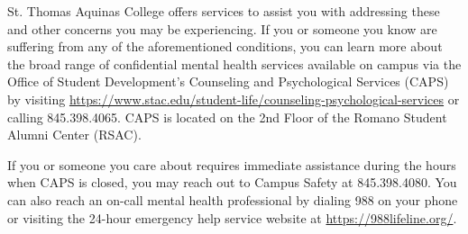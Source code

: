 \documentclass[11pt,letterpaper]{article}
\begin{document}
St. Thomas Aquinas College offers services to assist you with addressing these and other concerns you may be experiencing. If you or someone you know are suffering from any of the aforementioned conditions, you can learn more about the broad range of confidential mental health services available on campus via the Office of Student Development’s Counseling and Psychological Services (CAPS) by visiting \url{https://www.stac.edu/student-life/counseling-psychological-services} or calling 845.398.4065. CAPS is located on the 2nd Floor of the Romano Student Alumni Center (RSAC). \pspace

If you or someone you care about requires immediate assistance during the hours when CAPS is closed, you may reach out to Campus Safety at 845.398.4080. You can also reach an on-call mental health professional by dialing 988 on your phone or visiting the 24-hour emergency help service website at \url{https://988lifeline.org/}.





\newpage





\end{document}
